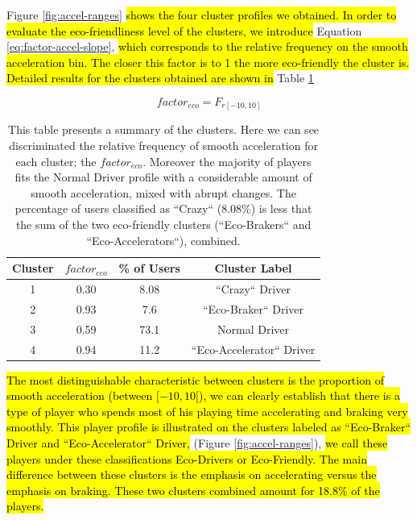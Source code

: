 \documentclass[preprint,authoryear,12pt]{elsarticle}
\newcommand{\hlc}[2][yellow]{ {\sethlcolor{#1} \hl{#2}} }
\begin{document}
Figure \ref{fig:accel-ranges} 
\hlc[green]{
	shows the four cluster profiles we obtained. In order to evaluate the eco-friendliness level of the clusters, we introduce
} Equation \ref{eq:factor-accel-slope}, 
\hlc[green]{which corresponds to the relative frequency on the smooth acceleration bin. The closer this factor is to 1 the more eco-friendly the cluster is.
Detailed results for the clusters obtained are shown in
} Table \ref{T:factors}

\begin{equation}\label{eq:factor-accel-slope}
factor_{eco} = F_{r[-10,10]}
\end{equation}

\begin{table}[!h]
	\renewcommand*{\arraystretch}{1.4}
	\caption{This table presents a summary of the clusters. Here we can see discriminated the relative frequency of smooth acceleration for each cluster; the $factor_{eco}$. Moreover the majority of players fits the Normal Driver profile with a considerable amount of smooth acceleration, mixed with abrupt changes. The percentage of users classified as ``Crazy`` (8.08\%) is less that the sum of the two eco-friendly clusters (``Eco-Brakers`` and ``Eco-Accelerators``), combined. }
	\begin{center}
		\begin{tabular}{c|c|c|c}
			Cluster & $factor_{eco}$ & \% of Users & Cluster Label \\
			\hline
			1 &	 0.30
			& 8.08  & ``Crazy`` Driver  \\
			
			2 & 0.93
			& 7.6  &  ``Eco-Braker`` Driver \\
			
			3 &	 0.59
			& 73.1  &  Normal Driver  \\
			
			4 & 0.94
			& 11.2  &  ``Eco-Accelerator`` Driver \\
		\end{tabular}
	\end{center}
	\label{T:factors}
\end{table}


\hlc[green]{
The most distinguishable characteristic between clusters is the proportion of smooth acceleration (between $[-10, 10[$), we can clearly establish that there is a type of player who spends most of his playing time accelerating and braking very smoothly. This player profile is illustrated on the clusters labeled as ``Eco-Braker`` Driver and  ``Eco-Accelerator`` Driver, 
}(Figure \ref{fig:accel-ranges}),
\hlc[green]{ we call these players under these classifications Eco-Drivers or Eco-Friendly. The main difference between these clusters is the emphasis on accelerating versus the emphasis on braking. These two clusters combined amount for 18.8\% of the players.
}
\end{document}

